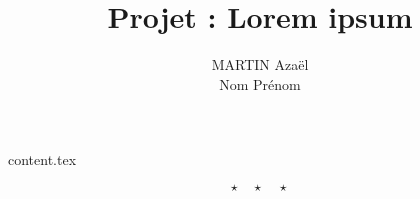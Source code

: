 \documentclass{rUTT}
\title{Projet : Lorem ipsum}
\author{{\sc MARTIN} Azaël \\ {\sc Nom} Prénom}
\begin{document}
    \frontpage
    \tableofcontents{} %

    \clearpage

    {content.tex}

    \[ \star \quad \star \quad \star \]
\end{document}
